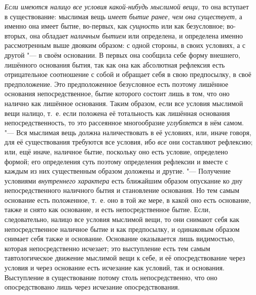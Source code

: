 {\em Если имеются налицо все условия какой-нибудь
мыслимой вещи,} то она вступает в существование: мыслимая вещь
{\em имеет бытие ранее, чем она существует,} а именно
она имеет бытие, во-первых, как {\em сущность} или как
безусловное; во-вторых, она обладает {\em наличным
бытием} или определена, и определена именно рассмотренным выше двояким
образом: с одной стороны, в своих условиях, а с другой "--- в своём основании.
В первых она сообщила себе форму внешнего, лишённого основания бытия, так
как она как абсолютная рефлексия есть отрицательное соотношение с собой и
обращает себя в свою предпосылку, в своё предположение. Это предположенное
безусловное есть поэтому лишённое основания непосредственное, бытие
которого состоит лишь в том, что оно налично как лишённое основания. Таким
образом, если все условия мыслимой вещи налицо, т.~е. если положена её
тотальность как лишённая основания непосредственность, то это рассеянное
многообразие {\em углубляется} в нём самом. "--- Вся
мыслимая вещь должна наличествовать в её условиях, или, иначе говоря, для
её существования требуются все условия, ибо {\em все}
они составляют рефлексию; или, ещё иначе, наличное бытие, поскольку оно
есть условие, определено формой; его определения суть поэтому определения
рефлексии и вместе с каждым из них существенным образом доложены и другие.
"--- Получение условиями {\em внутреннего характера} есть
ближайшим образом опускание ко дну непосредственного наличного бытия и
становление основания. Но тем самым основание есть положенное, т.~е. оно в
той же мере, в какой оно есть основание, также и снято как основание, и
есть непосредственное бытие. Если, следовательно, налицо все условия
мыслимой вещи, то они снимают себя как непосредственное наличное бытие и
как предпосылку, и одинаковым образом снимает себя также и основание.
Основание оказывается лишь видимостью, которая непосредственно исчезает;
это выступление есть тем самым тавтологическое движение мыслимой вещи к
себе, и её опосредствование через условия и через основание есть исчезание
как условий, так и основания. Выступление в существование потому столь
непосредственно, что оно опосредствовано лишь через исчезание
опосредствования.

